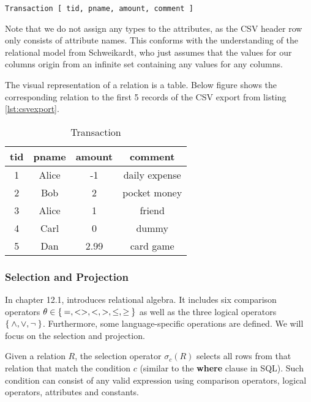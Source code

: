 \begin{center} \label{schema}
\verb+Transaction [ tid, pname, amount, comment ]+
\end{center}

Note that we do not assign any types to the attributes,
as the CSV header row only consists of attribute names.
This conforms with the understanding of the relational model
from Schweikardt, who just assumes that the values for our columns origin from an infinite set
containing any values for any columns.

The visual representation of a relation is a table. Below figure shows the
corresponding relation to the first 5 records of the CSV export from listing \ref{lst:csvexport}.

\begin{table}[htbp]
    \centering
    \begin{tabular}{|c|c|c|c|}
        \hline
        tid     & pname & amount    & comment \\ \hline\hline
        1       & Alice & -1        & daily expense \\ \hline
        2       & Bob   & 2         & pocket money \\ \hline
        3       & Alice & 1         & friend\\ \hline
        4       & Carl  & 0         & dummy\\ \hline
        5       & Dan   & 2.99      & card game\\ \hline
    \end{tabular}
    \caption{Transaction}
    \label{Transaction}
\end{table}

\subsubsection{Selection and Projection}

In chapter 12.1, \cite{Halp08} introduces relational algebra. It includes six
comparison operators $\theta \in \Set{=, <>, <, >, \leq, \geq}$ as well as the
three logical operators $\Set{\land, \lor, \neg}$. Furthermore, some
language-specific operations are defined. We will focus on the selection and projection.

Given a relation $R$, the selection operator $\sigma_c(R)$ selects all rows from
that relation that match the condition $c$ (similar to the \textbf{where} clause in \gls{SQL}).
Such condition can consist of any valid
expression using comparison operators, logical operators, attributes and constants.

